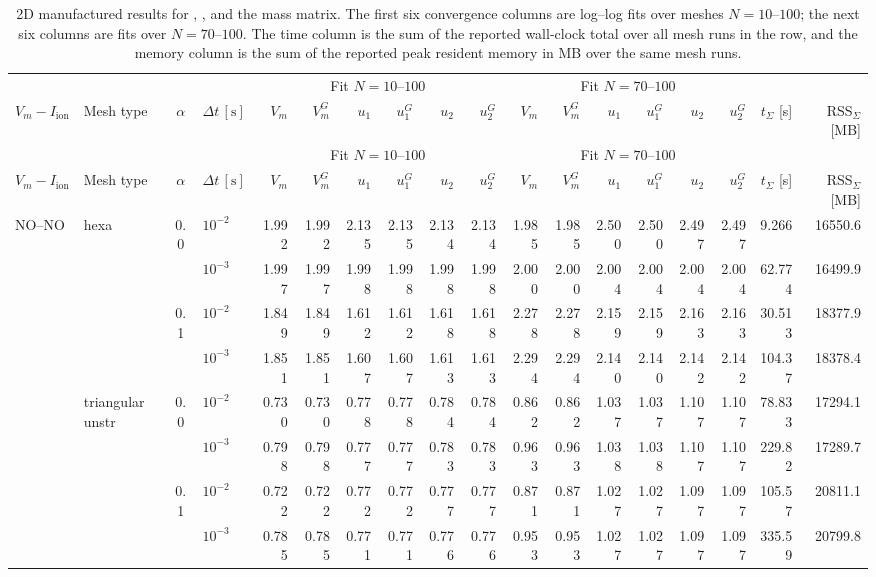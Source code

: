 \tiny
\setlength{\tabcolsep}{1.7pt}
\begin{longtable}{llclrrrrrrrrrrrrrr}
\caption{2D manufactured results for , , and the  mass matrix. The first six convergence columns are log--log fits over meshes $N=10$--$100$; the next six columns are fits over $N=70$--$100$. The time column is the sum of the reported wall-clock total over all mesh runs in the row, and the memory column is the sum of the reported peak resident memory in MB over the same mesh runs.}\label{tab:results-2d-jfnk-cn-cons}\\
\toprule
& & & & \multicolumn{6}{c}{Fit $N=10$--$100$} & \multicolumn{6}{c}{Fit $N=70$--$100$} & & \\
\cmidrule(lr){5-10}\cmidrule(lr){11-16}
$V_m-I_{\mathrm{ion}}$ & Mesh type & $\alpha$ & $\Delta t\,[\text{s}]$ & $V_m$ & $V_m^G$ & $u_1$ & $u_1^G$ & $u_2$ & $u_2^G$ & $V_m$ & $V_m^G$ & $u_1$ & $u_1^G$ & $u_2$ & $u_2^G$ & $t_{\Sigma}$ [s] & RSS$_{\Sigma}$ [MB] \\
\midrule
\endfirsthead
\toprule
& & & & \multicolumn{6}{c}{Fit $N=10$--$100$} & \multicolumn{6}{c}{Fit $N=70$--$100$} & & \\
\cmidrule(lr){5-10}\cmidrule(lr){11-16}
$V_m-I_{\mathrm{ion}}$ & Mesh type & $\alpha$ & $\Delta t\,[\text{s}]$ & $V_m$ & $V_m^G$ & $u_1$ & $u_1^G$ & $u_2$ & $u_2^G$ & $V_m$ & $V_m^G$ & $u_1$ & $u_1^G$ & $u_2$ & $u_2^G$ & $t_{\Sigma}$ [s] & RSS$_{\Sigma}$ [MB] \\
\midrule
\endhead
\multirow{8}{*}{NO--NO} & \multirow{4}{*}{hexa} & \multirow{2}{*}{0.0} & $10^{-2}$ & 1.992 & 1.992 & 2.135 & 2.135 & 2.134 & 2.134 & 1.985 & 1.985 & 2.500 & 2.500 & 2.497 & 2.497 & 9.266 & 16550.6 \\
& & & $10^{-3}$ & 1.997 & 1.997 & 1.998 & 1.998 & 1.998 & 1.998 & 2.000 & 2.000 & 2.004 & 2.004 & 2.004 & 2.004 & 62.774 & 16499.9 \\\cline{3-18}
& & \multirow{2}{*}{0.1} & $10^{-2}$ & 1.849 & 1.849 & 1.612 & 1.612 & 1.618 & 1.618 & 2.278 & 2.278 & 2.159 & 2.159 & 2.163 & 2.163 & 30.513 & 18377.9 \\
& & & $10^{-3}$ & 1.851 & 1.851 & 1.607 & 1.607 & 1.613 & 1.613 & 2.294 & 2.294 & 2.140 & 2.140 & 2.142 & 2.142 & 104.37 & 18378.4 \\\cline{2-18}
& \multirow{4}{*}{triangular unstr} & \multirow{2}{*}{0.0} & $10^{-2}$ & 0.730 & 0.730 & 0.778 & 0.778 & 0.784 & 0.784 & 0.862 & 0.862 & 1.037 & 1.037 & 1.107 & 1.107 & 78.833 & 17294.1 \\
& & & $10^{-3}$ & 0.798 & 0.798 & 0.777 & 0.777 & 0.783 & 0.783 & 0.963 & 0.963 & 1.038 & 1.038 & 1.107 & 1.107 & 229.82 & 17289.7 \\\cline{3-18}
& & \multirow{2}{*}{0.1} & $10^{-2}$ & 0.722 & 0.722 & 0.772 & 0.772 & 0.777 & 0.777 & 0.871 & 0.871 & 1.027 & 1.027 & 1.097 & 1.097 & 105.57 & 20811.1 \\
& & & $10^{-3}$ & 0.785 & 0.785 & 0.771 & 0.771 & 0.776 & 0.776 & 0.953 & 0.953 & 1.027 & 1.027 & 1.097 & 1.097 & 335.59 & 20799.8 \\\hline


\end{longtable}
